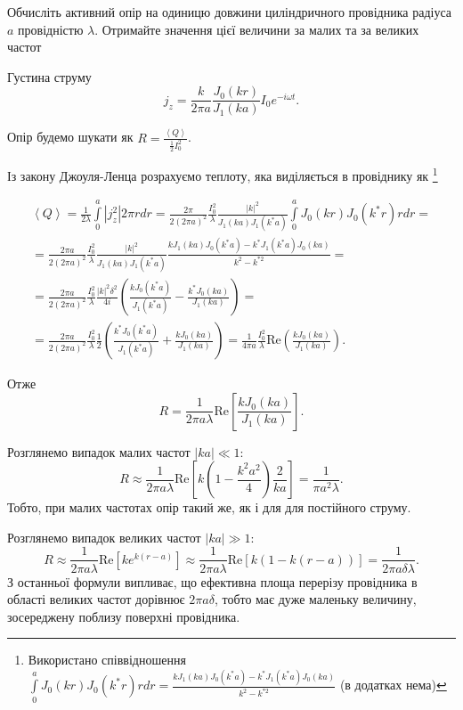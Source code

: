 \documentclass[]{ProblemBook}
\begin{document}
\begin{problem}
    Обчисліть активний опір на одиницю довжини циліндричного провідника радіуса $a$ провідністю $\lambda$. Отримайте значення цієї величини за малих та за великих частот
\begin{solution}


Густина струму 
\[
	j_z = \frac{k}{2\pi a} \frac{J_0(kr)}{J_1(ka)} I_0e^{-i\omega t}.
\]

Опір будемо шукати як $R = \frac{\left\langle Q \right\rangle }{\frac12I_0^2}$.


Із закону Джоуля-Ленца розрахуємо теплоту, яка виділяється в провіднику як%
\footnote{Використано співвідношення \href{https://www.wolframalpha.com/input/?i=integrate+from+0+to+a+besselJ0\%28k*x\%29*besselJ0\%28Conjugate\%28k\%29*x\%29+x+dx}{$\int\limits_0^a  J_0(kr)J_0(k^*r) r dr = \frac{kJ_1(ka)J_0(k^*a) - k^*J_1(k^*a)J_0(ka)}{k^2-k^{*2}} $} (в додатках нема)}

\begin{multline*}
    \left\langle Q \right\rangle = \frac1{2\lambda}\int\limits_0^a \left| j_z^2\right| 2\pi r dr = \frac{2\pi}{2(2\pi a)^2} \frac{I_0^2}{\lambda} \frac{|k|^2}{J_1(ka)J_1(k^*a)}  \int\limits_0^a  J_0(kr)J_0(k^*r) r dr = \\
    = \frac{2\pi a}{2(2\pi a)^2} \frac{I_0^2}{\lambda} \frac{|k|^2}{J_1(ka)J_1(k^*a)} \frac{kJ_1(ka)J_0(k^*a) - k^*J_1(k^*a)J_0(ka)}{k^2-k^{*2}} =\\
    = \frac{2\pi a }{2(2\pi a)^2} \frac{I_0^2}{\lambda} \frac{|k|^2\delta^2}{4i}\left( \frac{kJ_0(k^*a)}{J_1(k^*a)} - \frac{k^*J_0(ka)}{J_1(ka)}\right) = \\ = \frac{2\pi a}{2(2\pi a)^2} \frac{I_0^2}{\lambda} \frac12  \left( \frac{k^*J_0(k^*a)}{J_1(k^*a)} + \frac{kJ_0(ka)}{J_1(ka)}\right) =  \frac{1}{4\pi a} \frac{I_0^2}{\lambda}  \mathrm{Re}\left(  \frac{kJ_0(ka)}{J_1(ka)} \right).
\end{multline*}

Отже 
\[
    R = \frac{1}{2\pi a\lambda}  \mathrm{Re}\left[  \frac{kJ_0(ka)}{J_1(ka)} \right].
\]

Розглянемо випадок малих частот $|ka| \ll 1$:
\[
    R \approx \frac{1}{2\pi a\lambda}  \mathrm{Re} \left[k\left( 1 - \frac{k^2a^2}{4}\right)\frac{2}{ka}  \right] = \frac{1}{\pi a^2 \lambda}.
\]
Тобто, при малих частотах опір такий же, як і для для постійного струму.

Розглянемо випадок великих частот $|ka| \gg 1$:
\[
    R \approx \frac{1}{2\pi a\lambda} \mathrm{Re}\left[  ke^{k(r-a)} \right] \approx \frac{1}{2\pi a\lambda} \mathrm{Re}\left[  k(1-k(r-a)) \right] =  \frac{1}{2\pi a\delta\lambda}.
\]
З останньої формули випливає, що ефективна площа перерізу провідника в області великих частот дорівнює $2\pi a\delta$, тобто має дуже маленьку величину, зосереджену поблизу поверхні провідника.
\end{solution}
\end{problem}
\end{document}
